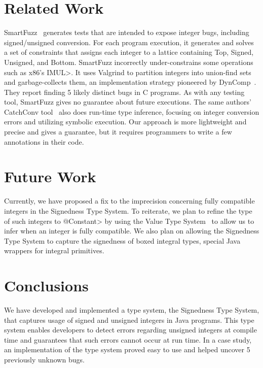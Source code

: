 \newpage
\section{Related Work} \label{related}

SmartFuzz~\cite{MolnarLW2009} generates tests that are intended to expose
integer bugs, including signed/unsigned conversion.  For each program
execution, it generates and solves a set of constraints that assigns each
integer to a lattice containing Top, Signed, Unsigned, and Bottom.
SmartFuzz incorrectly under-constrains some operations such as x86's
\<IMUL>.  It uses Valgrind to partition integers into union-find sets and
garbage-collects them, an implementation strategy pioneered by
DynComp~\cite{GuoPME2006}.  They report finding 5 likely distinct bugs in C
programs.  As with any testing tool, SmartFuzz gives no guarantee about
future executions.  The same authors' CatchConv tool~\cite{MolnarW2007}
also does run-time type inference, focusing on integer conversion errors
and utilizing symbolic execution.  Our approach is more lightweight and
precise and gives a guarantee, but it requires programmers to write a few
annotations in their code.

\section{Future Work} \label{future}
Currently, we have proposed a fix to the imprecision concerning fully
compatible integers in the Signedness Type System. To reiterate, we plan to
refine the type of such integers to \<@Constant> by using the
Value Type System~\cite{ValueChecker} to allow us to infer when an integer
is fully compatible. We also plan on allowing the Signedness Type System to
capture the signedness of boxed integral types, special Java wrappers for
integral primitives.


\section{Conclusions} \label{conc}

We have developed and implemented a type system, the Signedness Type System, that
captures usage of signed and unsigned
integers in Java programs.
This type system enables developers to detect errors regarding unsigned
integers at compile time and guarantees that such errors cannot occur at
run time. In a case study, an implementation of the type system proved easy to
use and helped uncover 5 previously unknown bugs.